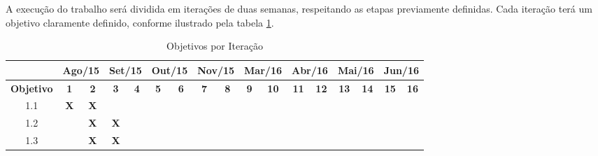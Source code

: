A execução do trabalho será dividida em iterações de duas semanas, respeitando
as etapas previamente definidas. Cada iteração terá um objetivo claramente
definido, conforme ilustrado pela tabela \ref{tab:cronograma}.

\begin{table}[htb!]
\centering
\caption{Objetivos por Iteração}
\label{tab:cronograma}
\begin{tabular}{c|c|c|c|c|c|c|c|c|c|c|c|c|c|c|c|c|}
\cline{2-17}
{\bf }                                & \multicolumn{2}{c|}{{\bf Ago/15}}             & \multicolumn{2}{c|}{{\bf Set/15}}             & \multicolumn{2}{c|}{{\bf Out/15}}             & \multicolumn{2}{c|}{{\bf Nov/15}}             & \multicolumn{2}{c|}{{\bf Mar/16}}             & \multicolumn{2}{c|}{{\bf Abr/16}} & \multicolumn{2}{c|}{{\bf Mai/16}} & \multicolumn{2}{c|}{{\bf Jun/16}} \\ \hline
\multicolumn{1}{|c|}{{\bf Objetivo}}  & {\bf 1}               & {\bf 2}               & {\bf 3}               & {\bf 4}               & {\bf 5}               & {\bf 6}               & {\bf 7}               & {\bf 8}               & {\bf 9}               & {\bf 10}              & {\bf 11}        & {\bf 12}        & {\bf 13}        & {\bf 14}        & {\bf 15}        & {\bf 16}        \\ \hline
\multicolumn{1}{|c|}{1.1}             & {\bf X}               & {\bf X}               &                       &                       &                       &                       &                       &                       &                       &                       &                 &                 &                 &                 &                 &                 \\ \hline
\multicolumn{1}{|c|}{1.2}             &                       & {\bf X}               & {\bf X}               &                       &                       &                       &                       &                       &                       &                       &                 &                 &                 &                 &                 &                 \\ \hline
\multicolumn{1}{|c|}{1.3}             &                       & {\bf X}               & {\bf X}               &                       &                       &                       &                       &                       &                       &                       &                 &                 &                 &                 &                 &                 \\ \hline

\end{tabular}
\end{table}

